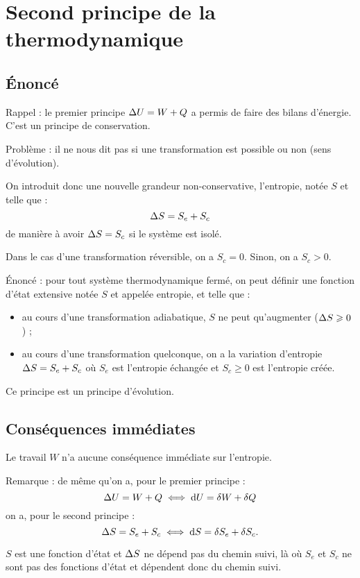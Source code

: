 \section{Second principe de la thermodynamique}

\subsection{Énoncé}

Rappel : le premier principe \(\adif{U}=W+Q\) a permis de faire des bilans d'énergie. C'est un principe de conservation.

Problème : il ne nous dit pas si une transformation est possible ou non (sens d'évolution).

On introduit donc une nouvelle grandeur non-conservative, l'entropie, notée \(S\) et telle que : \[\adif{S}=S_e+S_c\] de manière à avoir \(\adif{S}=S_c\) si le système est isolé.

Dans le cas d'une transformation réversible, on a \(S_c=0\). Sinon, on a \(S_c>0\).

Énoncé : pour tout système thermodynamique fermé, on peut définir une fonction d'état extensive notée \(S\) et appelée entropie, et telle que : \begin{itemize}
\item au cours d'une transformation adiabatique, \(S\) ne peut qu'augmenter (\(\adif{S}\geq0\)) ;
\item au cours d'une transformation quelconque, on a la variation d'entropie \(\adif{S}=S_e+S_c\) où \(S_e\) est l'entropie échangée et \(S_c\geq0\) est l'entropie créée. \\
\end{itemize}

Ce principe est un principe d'évolution.

\subsection{Conséquences immédiates}

Le travail \(W\) n'a aucune conséquence immédiate sur l'entropie.

Remarque : de même qu'on a, pour le premier principe : \[\adif{U}=W+Q\ssi\odif{U}=\fdif{W}+\fdif{Q}\] on a, pour le second principe : \[\adif{S}=S_e+S_c\ssi\odif{S}=\fdif{S_e}+\fdif{S_c}.\]

\(S\) est une fonction d'état et \(\adif{S}\) ne dépend pas du chemin suivi, là où \(S_e\) et \(S_c\) ne sont pas des fonctions d'état et dépendent donc du chemin suivi.

